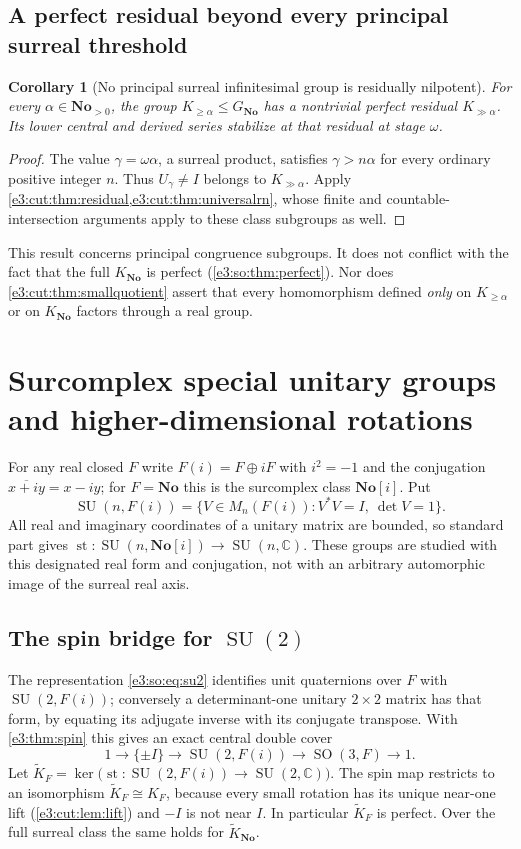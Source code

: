\documentclass[11pt,letterpaper]{article}
\numberwithin{equation}{section}
\newtheorem{corollary}[corollary]{Corollary}
\theoremstyle{definition}
\theoremstyle{remark}
\newcommand{\No}{\mathbf{No}}
\newcommand{\C}{\mathbb C}
\newcommand{\st}{\operatorname{st}}
\newcommand{\SO}{\operatorname{SO}}
\newcommand{\SU}{\operatorname{SU}}
\begin{document}
\subsection{A perfect residual beyond every principal surreal threshold}

\begin{corollary}[No principal surreal infinitesimal group is residually nilpotent]\label{e3:cut:cor:norn}
For every $\alpha\in\No_{>0}$, the group $K_{\ge\alpha}\le G_{\No}$ has a
nontrivial perfect residual $K_{\gg\alpha}$. Its lower central and derived
series stabilize at that residual at stage $\omega$.
\end{corollary}
\begin{proof}
The value $\gamma=\omega\alpha$, a surreal product, satisfies $\gamma>n\alpha$
for every ordinary positive integer $n$. Thus $U_\gamma\ne I$ belongs to
$K_{\gg\alpha}$. Apply \cref{e3:cut:thm:residual,e3:cut:thm:universalrn},
whose finite and countable-intersection arguments apply to these class
subgroups as well.
\end{proof}

This result concerns principal congruence subgroups. It does not conflict with
the fact that the full $K_{\No}$ is perfect (\cref{e3:so:thm:perfect}). Nor
does \cref{e3:cut:thm:smallquotient} assert that every homomorphism defined
\emph{only} on $K_{\ge\alpha}$ or on $K_{\No}$ factors through a real group.

\section{Surcomplex special unitary groups and higher-dimensional rotations}\label{e3:cut:sec:unitary}

For any real closed $F$ write $F(i)=F\oplus iF$ with $i^2=-1$ and the
conjugation $\overline{x+iy}=x-iy$; for $F=\No$ this is the surcomplex class
$\No[i]$. Put
\[
 \SU(n,F(i))=\{V\in M_n(F(i)):V^*V=I,\ \det V=1\}.
\]
All real and imaginary coordinates of a unitary matrix are bounded, so standard
part gives $\st:\SU(n,\No[i])\to\SU(n,\C)$. These groups are studied with this
designated real form and conjugation, not with an arbitrary automorphic image of
the surreal real axis.

\subsection{The spin bridge for \texorpdfstring{$\SU(2)$}{SU(2)}}

The representation \cref{e3:so:eq:su2} identifies unit quaternions over $F$
with $\SU(2,F(i))$; conversely a determinant-one unitary $2\times2$ matrix has
that form, by equating its adjugate inverse with its conjugate transpose. With
\cref{e3:thm:spin} this gives an exact central double cover
\[
 1\longrightarrow\{\pm I\}\longrightarrow\SU(2,F(i))\longrightarrow\SO(3,F)
 \longrightarrow1.
\]
Let $\widetilde K_F=\ker\bigl(\st:\SU(2,F(i))\to\SU(2,\C)\bigr)$. The spin map
restricts to an isomorphism $\widetilde K_F\cong K_F$, because every small
rotation has its unique near-one lift (\cref{e3:cut:lem:lift}) and $-I$ is not
near $I$. In particular $\widetilde K_F$ is perfect. Over the full surreal
class the same holds for $\widetilde K_{\No}$.
\end{document}
